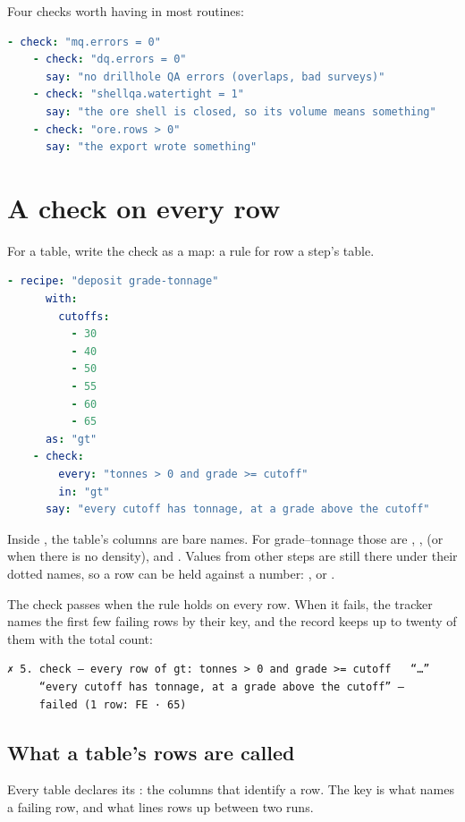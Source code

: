 Four checks worth having in most routines:

\begin{lstlisting}[language=yaml]
    - check: "mq.errors = 0"
    - check: "dq.errors = 0"
      say: "no drillhole QA errors (overlaps, bad surveys)"
    - check: "shellqa.watertight = 1"
      say: "the ore shell is closed, so its volume means something"
    - check: "ore.rows > 0"
      say: "the export wrote something"
\end{lstlisting}

\section{A check on every row}\label{sec:checks-rows}
For a table, write the check as a map: a rule for  row  a step's table.

\begin{lstlisting}[language=yaml]
    - recipe: "deposit grade-tonnage"
      with:
        cutoffs:
          - 30
          - 40
          - 50
          - 55
          - 60
          - 65
      as: "gt"
    - check:
        every: "tonnes > 0 and grade >= cutoff"
        in: "gt"
      say: "every cutoff has tonnage, at a grade above the cutoff"
\end{lstlisting}

Inside , the table's columns are bare names. For grade–tonnage those are , ,  (or  when there is no density),  and . Values from other steps are still there under their dotted names, so a row can be held against a number: , or .

The check passes when the rule holds on every row. When it fails, the tracker names the first few failing rows by their key, and the record keeps up to twenty of them with the total count:

\begin{lstlisting}
✗ 5. check — every row of gt: tonnes > 0 and grade >= cutoff   “…”
     “every cutoff has tonnage, at a grade above the cutoff” —
     failed (1 row: FE · 65)
\end{lstlisting}

\subsection{What a table's rows are called}
Every table declares its : the columns that identify a row. The key is what names a failing row, and what lines rows up between two runs.

